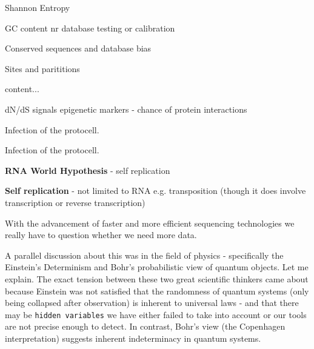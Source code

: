 \documentclass[11pt]{report}
\begin{document}
{Shannon Entropy 


GC content 
	nr database testing or calibration 
	
Conserved sequences and database bias 


\begin{tcolorbox}[title=Hierarchical information, coltitle=AntiqueWhite1, breakable]
	Sites and parititions
\end{tcolorbox}


\begin{tcolorbox}[title=Non-coding "genes", coltitle=AntiqueWhite1, breakable]
	content...
\end{tcolorbox}

\begin{tcolorbox}[title=Signal and noise, coltitle=AntiqueWhite1, breakable]
	dN/dS signals
	epigenetic markers - chance of protein interactions 
\end{tcolorbox}


\begin{tcolorbox}[title=Viruses and the vines of life, coltitle=AntiqueWhite1, breakable]
	
Infection of the protocell.


\end{tcolorbox}

\begin{tcolorbox}[title=Origin of Life, coltitle=AntiqueWhite1, breakable]
	
	Infection of the protocell.
	
	\textbf{RNA World Hypothesis} - self replication 
	
	
	\textbf{Self replication}
	- not limited to RNA e.g. transposition (though it does involve transcription or reverse transcription)
	
	
\end{tcolorbox}

\begin{tcolorbox}[title=More data or better tools?, coltitle=AntiqueWhite1, breakable]
	With the advancement of faster and more efficient sequencing technologies we really have to question whether we need more data.
	
	A parallel discussion about this was in the field of physics - specifically the Einstein's Determinism and Bohr's probabilistic view of quantum objects. Let me explain. The exact tension between these two great scientific thinkers came about because Einstein was not satisfied that the randomness of quantum systems (only being collapsed after observation) is inherent to universal laws - and that there may be \texttt{hidden variables} we have either failed to take into account or our tools are not precise enough to detect. In contrast, Bohr's view (the Copenhagen interpretation) suggests inherent indeterminacy in quantum systems.
	

\end{tcolorbox}}
\end{document}
